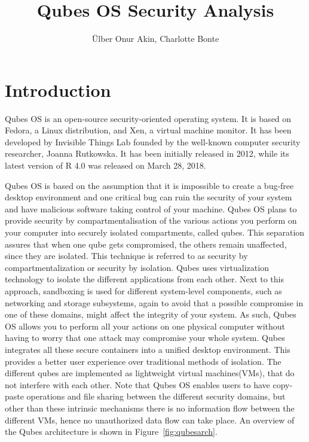 \documentclass[runningheads,a4paper]{article}
\begin{document}
\title{Qubes OS Security Analysis}

\author{\"Ulber Onur Akin, Charlotte Bonte}

\maketitle

\tableofcontents

\newpage
\section{Introduction}
Qubes OS is an open-source security-oriented operating system.  It is
based on Fedora, a Linux distribution, and Xen, a virtual machine
monitor.  It has been developed by Invisible Things Lab founded by the
well-known computer security researcher, Joanna Rutkowska. It has been
initially released in 2012, while its latest version of R 4.0 was
released on March 28, 2018.

Qubes OS is based on the assumption that it is impossible to create a
bug-free desktop environment and one critical bug can ruin the
security of your system and have malicious software taking control
of your machine. Qubes OS plans to provide security by
compartmentalisation of the various actions you perform on your
computer into securely isolated compartments, called qubes.  This
separation assures that when one qube gets compromised, the others
remain unaffected, since they are isolated.  This technique is
referred to as security by compartmentalization or security by
isolation.  Qubes uses virtualization technology to isolate the
different applications from each other. Next to this approach,
sandboxing is used for different system-level components, such as
networking and storage subsystems, again to avoid that a possible compromise in
one of these domains, might affect the integrity of your system. As such, Qubes OS
allows you to perform all your actions on one physical computer
without having to worry that one attack may compromise your whole
system. Qubes integrates all these secure containers into a unified
desktop environment. This provides a better user experience over
traditional methods of isolation. The different qubes are implemented
as lightweight virtual machines(VMs), that do not interfere with each
other.  Note that Qubes OS enables users to have copy-paste operations
and file sharing between the different security domains, but other
than these intrinsic mechanisms there is no information flow between
the different VMs, hence no unauthorized data flow can take place. An
overview of the Qubes architecture is shown in
Figure~\ref{fig:qubesarch}.
\end{document}
